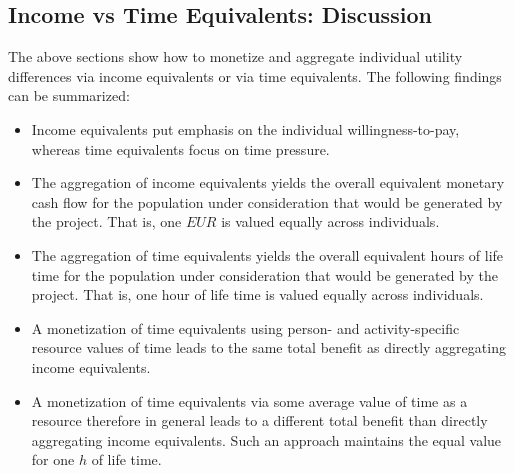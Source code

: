 \subsection{Income vs Time Equivalents: Discussion}
\label{ch:economicEval:aggregatingValues:discussion:incVsTime}
The above sections show how to monetize and aggregate individual utility differences via income equivalents or via time equivalents. The following findings can be summarized:
%
\begin{itemize}\styleItemize
%
\item Income equivalents put emphasis on the individual willingness-to-pay, whereas time equivalents focus on time pressure.
%
\item The aggregation of income equivalents yields the overall
equivalent monetary cash flow for
the population under consideration
that would be generated by the project.
%
That is, one $\mathit{EUR}$ is valued equally across individuals.
%
\item The aggregation of time equivalents yields the overall 
equivalent hours of life time for 
the population under consideration
that would be generated by the project.
%
%
That is, one hour of life time is valued equally across individuals.
%
\item A monetization of time equivalents using person- and activity-specific resource values of time leads to the same total benefit as directly aggregating income equivalents. 
%
\item A monetization of time equivalents via some average value of time as a resource therefore in general leads to a different total benefit than directly aggregating income equivalents.  Such an approach maintains the equal value for one $h$ of life time.
%
\end{itemize}

